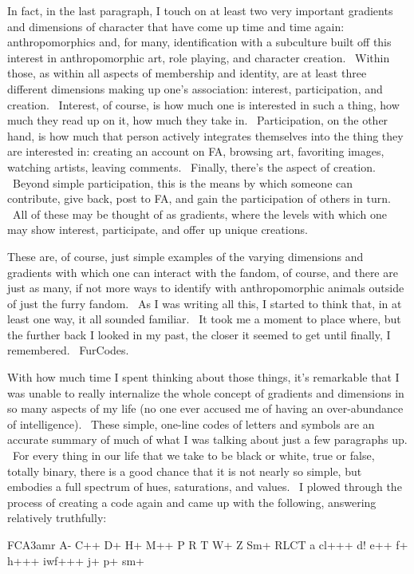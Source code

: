 In fact, in the last paragraph, I touch on at least two very important
gradients and dimensions of character that have come up time and time
again: anthropomorphics and, for many, identification with a subculture
built off this interest in anthropomorphic art, role playing, and
character creation. ~Within those, as within all aspects of membership
and identity, are at least three different dimensions making up one's
association: interest, participation, and creation. ~Interest, of
course, is how much one is interested in such a thing, how much they
read up on it, how much they take in. ~Participation, on the other hand,
is how much that person actively integrates themselves into the thing
they are interested in: creating an account on FA, browsing art,
favoriting images, watching artists, leaving comments. ~Finally, there's
the aspect of creation. ~Beyond simple participation, this is the means
by which someone can contribute, give back, post to FA, and gain the
participation of others in turn. ~All of these may be thought of as
gradients, where the levels with which one may show interest,
participate, and offer up unique creations.

These are, of course, just simple examples of the varying dimensions and
gradients with which one can interact with the fandom, of course, and
there are just as many, if not more ways to identify with
anthropomorphic animals outside of just the furry fandom. ~As I was
writing all this, I started to think that, in at least one way, it all
sounded familiar. ~It took me a moment to place where, but the further
back I looked in my past, the closer it seemed to get until finally, I
remembered. ~FurCodes.

With how much time I spent thinking about those things, it's remarkable
that I was unable to really internalize the whole concept of gradients
and dimensions in so many aspects of my life (no one ever accused me of
having an over-abundance of intelligence). ~These simple, one-line codes
of letters and symbols are an accurate summary of much of what I was
talking about just a few paragraphs up. ~For every thing in our life
that we take to be black or white, true or false, totally binary, there
is a good chance that it is not nearly so simple, but embodies a full
spectrum of hues, saturations, and values. ~I plowed through the process
of creating a code again and came up with the following, answering
relatively truthfully:

FCA3amr A- C++ D+ H+ M++ P R T W+ Z Sm+ RLCT a cl+++ d! e++ f+ h+++
iwf+++ j+ p+ sm+

